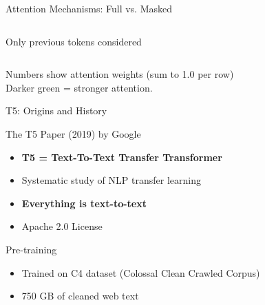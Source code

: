 \documentclass[aspectratio=169]{beamer}
\begin{document}
\begin{frame}{Attention Mechanisms: Full vs. Masked}
\begin{columns}

\vspace{0.2cm}
{\small Only previous tokens considered}

\end{columns}

\vspace{0.3cm}
\small
Numbers show attention weights (sum to 1.0 per row)\\
Darker green = stronger attention.
\end{frame}

\begin{frame}{T5: Origins and History}
\begin{block}{The T5 Paper (2019) by Google}
\begin{itemize}
  \item \textbf{T5 = Text-To-Text Transfer Transformer}
  \item Systematic study of NLP transfer learning
  \item \textbf{Everything is text-to-text}
  \item Apache 2.0 License
\end{itemize}

\end{block}
\begin{block}{Pre-training}
\begin{itemize}
  \item Trained on C4 dataset (Colossal Clean Crawled Corpus)
  \item 750 GB of cleaned web text
\end{itemize}
\end{block}
\end{frame}
\end{document}

